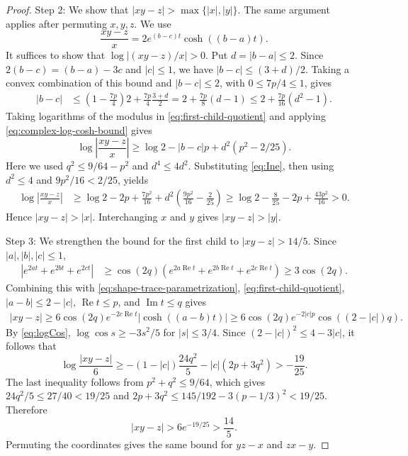 \documentclass[10pt,twoside]{article}
\theoremstyle{plain}
\theoremstyle{definition}
\theoremstyle{remark}
\begin{document}
\begin{proof}
Step 2: We show that $|xy-z|>\max\{|x|,|y|\}$.
The same argument applies after permuting $x,y,z$. We use
\begin{equation}
\label{eq:first-child-quotient}
\frac{xy-z}{x}=2e^{(b-c)t}\cosh((b-a)t).
\end{equation}
It suffices to show that $\log|(xy-z)/x|>0$.
Put $d=|b-a|\leq2$.
Since $2(b-c)=(b-a)-3c$ and $|c|\leq1$,
we have $|b-c|\leq(3+d)/2$.
Taking a convex combination of this bound and $|b-c|\leq2$,
with $0\leq7p/4\leq1$, gives
\begin{equation}
\label{eq:Ine}
\begin{aligned}
|b-c|
&\leq\left(1-\frac{7p}{4}\right)2
+\frac{7p}{4}\frac{3+d}{2}=2+\frac{7p}{8}(d-1)
\leq2+\frac{7p}{16}(d^2-1).
\end{aligned}
\end{equation}
Taking logarithms of the modulus in \eqref{eq:first-child-quotient}
and applying \eqref{eq:complex-log-cosh-bound} gives
$$
\log\left|\frac{xy-z}{x}\right|
\geq\log2-|b-c|p+d^2(p^2-2/25).
$$
Here we used $q^2\leq9/64-p^2$ and $d^4\leq4d^2$.
Substituting \eqref{eq:Ine}, then using $d^2\leq4$ and
$9p^2/16<2/25$, yields
\begin{equation*}
\begin{aligned}
\log\left|\frac{xy-z}{x}\right|
&\geq\log2-2p+\frac{7p^2}{16}
+d^2\left(\frac{9p^2}{16}-\frac2{25}\right)\geq\log2-\frac8{25}-2p+\frac{43p^2}{16}>0.
\end{aligned}
\end{equation*}
Hence $|xy-z|>|x|$. Interchanging $x$ and $y$ gives
$|xy-z|>|y|$.

Step 3: We strengthen the bound for the first child to $|xy-z|>14/5$.
Since $|a|,|b|,|c|\leq1$,
$$
\begin{aligned}
\left|e^{2at}+e^{2bt}+e^{2ct}\right|
&\geq\cos(2q)
\left(e^{2a\operatorname{Re}t}
+e^{2b\operatorname{Re}t}
+e^{2c\operatorname{Re}t}\right)\geq3\cos(2q).
\end{aligned}
$$
Combining this with \eqref{eq:shape-trace-parametrization},
\eqref{eq:first-child-quotient}, $|a-b|\leq2-|c|$, $\operatorname{Re}t \le p$, and $\operatorname{Im}t \le q$ gives
\begin{equation*}
\begin{aligned}
|xy-z|
\geq6\cos(2q)e^{-2c\operatorname{Re}t}
|\cosh((a-b)t)|\geq6\cos(2q)e^{-2|c|p}\cos((2-|c|)q).
\end{aligned}
\end{equation*}
By \eqref{eq:logCos}, $\log\cos s\geq-3s^2/5$ for $|s|\leq3/4$.
Since $(2-|c|)^2\leq4-3|c|$, it follows that
$$
\log\frac{|xy-z|}{6}
\geq-(1-|c|)\frac{24q^2}{5}
-|c|(2p+3q^2)>-\frac{19}{25}.
$$
The last inequality follows from $p^2+q^2\leq9/64$, which gives
$24q^2/5\leq27/40<19/25$ and
$2p+3q^2\leq145/192-3(p-1/3)^2<19/25$.
Therefore
$$
|xy-z|>6e^{-19/25}>\frac{14}{5}.
$$
Permuting the coordinates gives the same bound for $yz-x$ and $zx-y$.


\end{proof}
\end{document}
